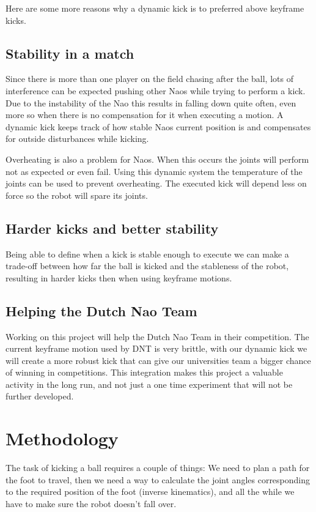 \documentclass[a4paper]{article}
\begin{document}
Here are some more reasons why a dynamic kick is to preferred above keyframe
kicks.

\subsection{Stability in a match}
Since there is more than one player on
the field  chasing after the ball,
lots of interference can be expected pushing other Naos while trying to perform a kick. Due to the
instability of the Nao this results in falling down quite often, even more
so when there is no compensation for it when executing a motion. A dynamic
kick keeps track of how stable Naos current position is and compensates for
outside disturbances while kicking. 

Overheating is also a problem for Naos. When this occurs the joints will perform
not as expected or even fail. Using this dynamic system the temperature of the
joints can be used to prevent overheating. The executed kick will depend less
on force so the robot will spare its joints.

\subsection{Harder kicks and better stability}
Being able to define when a kick is stable enough to execute we can make a
trade-off between how far the ball is kicked and the stableness of the
robot, resulting in harder kicks then when using keyframe motions.

\subsection{Helping the Dutch Nao Team}
 Working on this project will help the Dutch Nao Team in their competition. The
current keyframe motion used by DNT is very brittle, with our dynamic kick we will create a
more robust kick that can give our universities team a bigger chance of
winning in competitions. 
This integration makes this project a valuable activity in the long run, and not
just a one time experiment that will not be further developed.

\section{Methodology}
The task of kicking a ball requires a couple of things: We need to plan a path
for the foot to travel, then we need a way to calculate the joint angles
corresponding to the required position of the foot (inverse kinematics), and all
the while we have to make sure the robot doesn't fall over.
\end{document}
